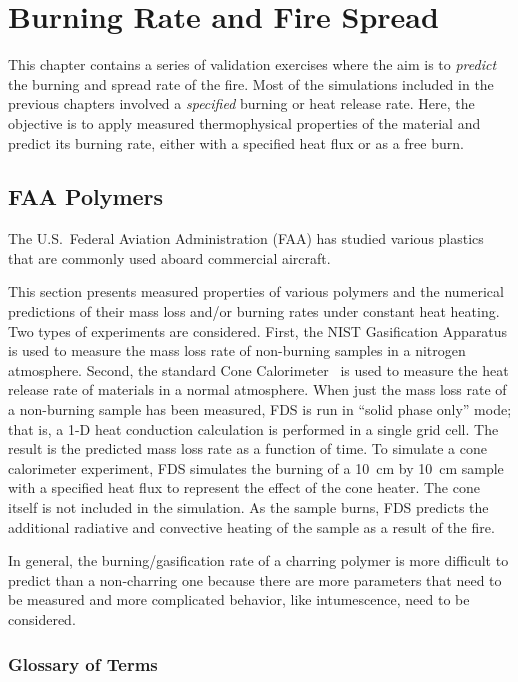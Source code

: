 
\chapter{Burning Rate and Fire Spread}

This chapter contains a series of validation exercises where the aim is to {\em predict} the burning and spread rate of the fire. Most of the simulations included in the previous chapters involved a {\em specified} burning or heat release rate. Here, the objective is to apply measured thermophysical properties of the material and predict its burning rate, either with a specified heat flux or as a free burn.

\section{FAA Polymers}\label{sec_FAA_Polymers}

The U.S.~Federal Aviation Administration (FAA) has studied various plastics that are commonly used aboard commercial aircraft.

This section presents measured properties of various polymers and the numerical predictions of their mass loss and/or burning rates under constant heat heating. Two types of experiments are considered. First, the NIST Gasification Apparatus is used to measure the mass loss rate of non-burning samples in a nitrogen atmosphere. Second, the standard Cone Calorimeter~\cite{conecal} is used to measure the heat release rate of materials in a normal atmosphere. When just the mass loss rate of a non-burning sample has been measured, FDS is run in ``solid phase only'' mode; that is, a 1-D heat conduction calculation is performed in a single grid cell. The result is the predicted mass loss rate as a function of time. To simulate a cone calorimeter experiment, FDS simulates the burning of a 10~cm by 10~cm sample with a specified heat flux to represent the effect of the cone heater. The cone itself is not included in the simulation. As the sample burns, FDS predicts the additional radiative and convective heating of the sample as a result of the fire.

In general, the burning/gasification rate of a charring polymer is more difficult to predict than a non-charring one because there are more parameters that need to be measured and
more complicated behavior, like intumescence, need to be considered.

\subsection{Glossary of Terms}
\label{glossary}

